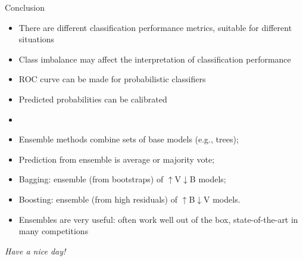 \documentclass[xcolor=table,aspectratio=169]{beamer}
\begin{document}
\begin{frame}{Conclusion}
	\begin{itemize}
		\item There are different classification performance metrics, suitable for different situations
		\item Class imbalance may affect the interpretation of classification performance
		\item ROC curve can be made for probabilistic classifiers
		\item Predicted probabilities can be calibrated
		\item[]
		\item Ensemble methods combine sets of base models (e.g., trees);
		\item Prediction from ensemble is average or majority vote;
		\item Bagging: ensemble (from bootstraps) of $\uparrow$V$\downarrow$B models;
		\item Boosting: ensemble (from high residuals) of $\uparrow$B$\downarrow$V models.
		\item Ensembles are very useful: often work well out of the box, state-of-the-art in many competitions
	\end{itemize}
\end{frame}
\begin{frame}
	
\begin{center}
	\emph{Have a nice day!}    
\end{center}
	
\end{frame}
\end{document}
